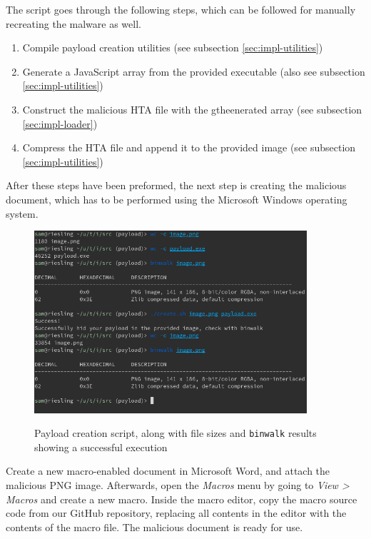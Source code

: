 The script goes through the following steps, which can be followed for manually recreating the malware as well.
\begin{enumerate}
    \item Compile payload creation utilities (see subsection \ref{sec:impl-utilities})
    \item Generate a JavaScript array from the provided executable (also see subsection \ref{sec:impl-utilities})
    \item Construct the malicious \acrshort{HTA} file with the gtheenerated array (see subsection \ref{sec:impl-loader})
    \item Compress the \acrshort{HTA} file and append it to the provided image (see subsection \ref{sec:impl-utilities})
\end{enumerate}

After these steps have been preformed, the next step is creating the malicious document, which has to be performed using
the Microsoft Windows operating system. 
\begin{figure}[H]
  \centering
  \includegraphics[width=0.9\textwidth]{figures/payload_creation_script.png}
  \label{payload_creation_script}
  \caption{Payload creation script, along with file sizes and \texttt{binwalk} results showing a successful execution}
\end{figure}

Create a new macro-enabled document in Microsoft Word, and attach the malicious \acrshort{PNG} image.
Afterwards, open the \emph{Macros} menu by going to \emph{View > Macros} and create a new macro. Inside the macro
editor, copy the macro source code from our GitHub repository, replacing all contents in the editor with the contents of
the macro file. The malicious document is ready for use.

